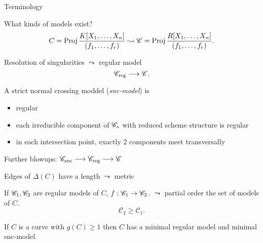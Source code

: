\begin{frame}{Terminology}
\begin{figure}[ht]
    \centering
\end{figure}
\end{frame}


\begin{frame}
	What kinds of models exist?\[
		C = \operatorname{Proj} \frac{K[X_1, \ldots, X_n]}{(f_1, \ldots, f_r)}
		\leadsto \mathscr C = \operatorname{Proj} \frac{R[X_1, \ldots, X_n]}{(f_1, \ldots, f_r)}
	.\] 

	\pause
	Resolution of singularities $\leadsto $ regular model 
	\[
		\mathscr C _\text{reg}  \longrightarrow \mathscr C 
	.\]




\end{frame}
\begin{frame}
	\begin{definition}
		A strict normal crossing moddel (\emph{snc-model}) is 
		\begin{itemize}
			\item regular
			\item each irreducible component of $\mathscr C_s$ with reduced scheme structure is regular 
			\item in each intersection point, exactly 2 components meet transversally
		\end{itemize}
	\end{definition}
	Further blowups: $\mathscr {\mathscr C}_\text{snc} \longrightarrow \mathscr {\mathscr C}_\text{reg} \longrightarrow \mathscr {\mathscr C}$

\end{frame}


\begin{frame}
    Edges of $\Delta(C)$ have a length $\leadsto$ metric 
\end{frame}
\begin{frame}
	If $\mathscr C_1, \mathscr C_2$ are regular models of $C$, $f: \mathscr C_1 \to \mathscr C_2$.
	$\leadsto$ partial order the set of models of $C$. 
	\[
	\mathscr C_2 \ge \mathscr C_1
	.\] 

	\pause
\begin{theorem}
		If $C$ is a curve with $g(C) \ge 1$ then $C$ has a minimal regular model and minimal snc-model.
\end{theorem}
\end{frame}





